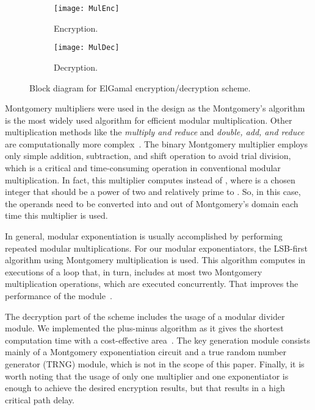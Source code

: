 \documentclass[conference]{IEEEtran}
\begin{document}
\begin{figure}
    \centering
    \begin{subfigure}[htb]{0.73\linewidth}\centering
            \texttt{[image: MulEnc]}
            \caption{Encryption.}
    \end{subfigure}
    \begin{subfigure}[htb]{0.73\linewidth}\centering
            \texttt{[image: MulDec]}
            \caption{Decryption.}
    \end{subfigure}
    \caption{Block diagram for ElGamal encryption/decryption scheme.}
    \label{fig:Mul}
\end{figure}

Montgomery multipliers were used in the design as the Montgomery's algorithm{\color{blue}~\cite{Montgomery85}} is the most widely used algorithm for efficient modular multiplication. Other multiplication methods like the \textit{multiply and reduce} and \textit{double, add, and reduce} are computationally more complex{\color{blue}~\cite{book:Deschamps09}}. The binary Montgomery multiplier employs only simple addition, subtraction, and shift operation to avoid trial division, which is a critical and time-consuming operation in conventional modular multiplication. In fact, this multiplier computes  instead of , where  is a chosen integer that should be a power of two and relatively prime to . So, in this case, the operands need to be converted into and out of Montgomery's domain each time this multiplier is used. 

In general, modular exponentiation is usually accomplished by performing repeated modular multiplications. For our modular exponentiators, the LSB-first algorithm using Montgomery multiplication is used. This algorithm computes  in  executions of a loop that, in turn, includes at most two Montgomery multiplication operations, which are executed concurrently. That improves the performance of the module{\color{blue}~\cite{book:Deschamps09}}. 

The decryption part of the scheme includes the usage of a modular divider module. We implemented the plus-minus algorithm as it gives the shortest computation time with a cost-effective area{\color{blue}~\cite{jour:Div06}}. The key generation module consists mainly of a Montgomery exponentiation circuit and a true random number generator (TRNG) module, which is not in the scope of this paper. Finally, it is worth noting that the usage of only one multiplier and one exponentiator is enough to achieve the desired encryption results, but that results in a high critical path delay. 
 
\end{document}
